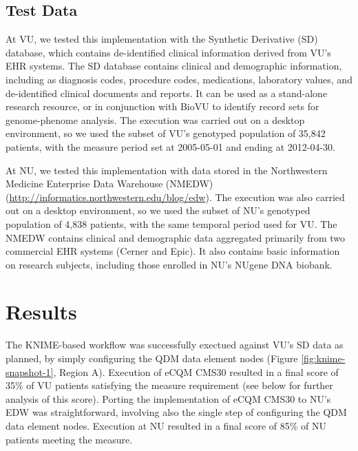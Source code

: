 \documentclass{article}
\begin{document}
\subsection{Test Data}

At VU, we tested this implementation with the Synthetic Derivative (SD) database\cite{roden_development_2008}, which contains de-identified clinical information derived from VU's EHR systems. The SD database contains clinical and demographic information, including as diagnosis codes, procedure codes, medications, laboratory values, and de-identified clinical documents and reports. It can be used as a stand-alone research resource, or in conjunction with BioVU to identify record sets for genome-phenome analysis. The execution was carried out on a desktop environment, so we used the subset of VU's genotyped population of 35,842 patients, with the measure period set at 2005-05-01 and ending at 2012-04-30.

At NU, we tested this implementation with data stored in the Northwestern Medicine Enterprise Data Warehouse (NMEDW) (\url{http://informatics.northwestern.edu/blog/edw}). The execution was also carried out on a desktop environment, so we used the subset of NU's genotyped population of 4,838 patients, with the same temporal period used for VU.  The NMEDW contains clinical and demographic data aggregated primarily from two commercial EHR systems (Cerner and Epic). It also contains basic information on research subjects, including those enrolled in NU's NUgene DNA biobank.


\section{Results}

The KNIME-based workflow was successfully exectued against VU's SD data as planned, by simply configuring the QDM data element nodes (Figure \ref{fig:knime-snapshot-1}, Region A). Execution of eCQM CMS30 resulted in a final score of 35\% of VU patients satisfying the measure requirement (see below for further analysis of this score). Porting the implementation of eCQM CMS30 to NU's EDW was straightforward, involving also the single step of configuring the QDM data element nodes. Execution at NU resulted in a final score of 85\% of NU patients meeting the measure.
\end{document}
